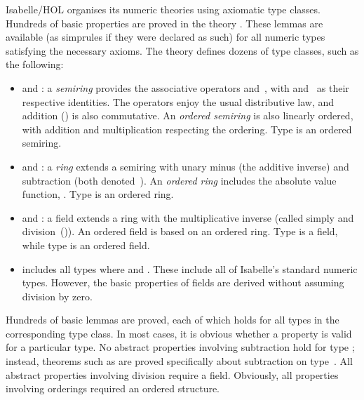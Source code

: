 Isabelle/HOL organises its numeric theories using axiomatic type classes.
Hundreds of basic properties are proved in the theory .
These lemmas are available (as simprules if they were declared as such)
for all numeric types satisfying the necessary axioms. The theory defines
dozens of type classes, such as the following:
\begin{itemize}
\item 
{} and : a \emph{semiring}
provides the associative operators \isa{+} and~\isa{*}, with  and~
as their respective identities. The operators enjoy the usual distributive law,
and addition (\isa{+}) is also commutative.
An \emph{ordered semiring} is also linearly
ordered, with addition and multiplication respecting the ordering. Type  is an ordered semiring.
\item 
{} and : a \emph{ring} extends a semiring
with unary minus (the additive inverse) and subtraction (both
denoted~\isa{-}). An \emph{ordered ring} includes the absolute value
function, . Type  is an ordered ring.
\item 
{} and : a field extends a ring with the
multiplicative inverse (called simply  and division~(\isa{/})).
An ordered field is based on an ordered ring. Type  is a field, while type  is an ordered field.
\item 
{} includes all types where 
and . These include all of Isabelle's standard numeric types.
However, the basic properties of fields are derived without assuming
division by zero.
\end{itemize}

Hundreds of basic lemmas are proved, each of which
holds for all types in the corresponding type class. In most
cases, it is obvious whether a property is valid for a particular type. No
abstract properties involving subtraction hold for type ;
instead, theorems such as
 are proved specifically about subtraction on
type~. All abstract properties involving division require a field.
Obviously, all properties involving orderings required an ordered
structure.


